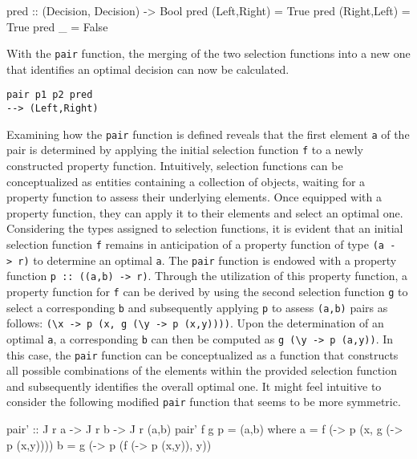 \documentclass[runningheads]{llncs}
\begin{document}
\begin{code}
pred :: (Decision, Decision) -> Bool
pred (Left,Right) = True
pred (Right,Left) = True
pred _            = False
\end{code}

With the \texttt{pair} function, the merging of the two selection
functions into a new one that identifies an optimal decision can now be
calculated.

\begin{verbatim}
pair p1 p2 pred
--> (Left,Right)
\end{verbatim}

Examining how the \texttt{pair} function is defined reveals that the
first element \texttt{a} of the pair is determined by applying the
initial selection function \texttt{f} to a newly constructed property
function. Intuitively, selection functions can be conceptualized as
entities containing a collection of objects, waiting for a property
function to assess their underlying elements. Once equipped with a
property function, they can apply it to their elements and select an
optimal one. Considering the types assigned to selection functions, it
is evident that an initial selection function \texttt{f} remains in
anticipation of a property function of type
\texttt{(a\ -\textgreater{}\ r)} to determine an optimal \texttt{a}. The
\texttt{pair} function is endowed with a property function
\texttt{p\ ::\ ((a,b)\ -\textgreater{}\ r)}. Through the utilization of
this property function, a property function for \texttt{f} can be
derived by using the second selection function \texttt{g} to select a
corresponding \texttt{b} and subsequently applying \texttt{p} to assess
\texttt{(a,b)} pairs as follows:
\texttt{(\textbackslash{}x\ -\textgreater{}\ p\ (x,\ g\ (\textbackslash{}y\ -\textgreater{}\ p\ (x,y))))}.
Upon the determination of an optimal \texttt{a}, a corresponding
\texttt{b} can then be computed as
\texttt{g\ (\textbackslash{}y\ -\textgreater{}\ p\ (a,y))}. In this
case, the \texttt{pair} function can be conceptualized as a function
that constructs all possible combinations of the elements within the
provided selection function and subsequently identifies the overall
optimal one. It might feel intuitive to consider the following modified
\texttt{pair} function that seems to be more symmetric.

\begin{code}
pair' :: J r a -> J r b -> J r (a,b)
pair' f g p = (a,b)
  where
      a = f (\x -> p (x, g (\y -> p (x,y))))
      b = g (\y -> p (f (\x -> p (x,y)), y))
\end{code}
\end{document}
